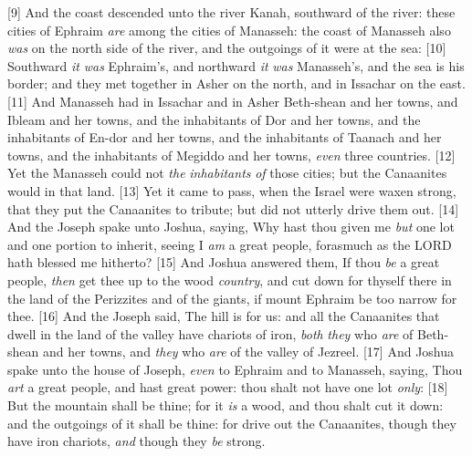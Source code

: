 [9] \textcolor[cmyk]{0.99998,1,0,0}{And the coast descended unto the river Kanah, southward of the river: these cities of Ephraim \emph{are} among the cities of Manasseh: the coast of Manasseh also \emph{was} on the north side of the river, and the outgoings of it were at the sea:}
[10] \textcolor[cmyk]{0.99998,1,0,0}{Southward \emph{it} \emph{was} Ephraim's, and northward \emph{it} \emph{was} Manasseh's, and the sea is his border; and they met together in Asher on the north, and in Issachar on the east.}
[11] \textcolor[cmyk]{0.99998,1,0,0}{And Manasseh had in Issachar and in Asher Beth-shean and her towns, and Ibleam and her towns, and the inhabitants of Dor and her towns, and the inhabitants of En-dor and her towns, and the inhabitants of Taanach and her towns, and the inhabitants of Megiddo and her towns, \emph{even} three countries.}
[12] \textcolor[cmyk]{0.99998,1,0,0}{Yet the  Manasseh could not  \emph{the} \emph{inhabitants} \emph{of} those cities; but the Canaanites would  in that land.}
[13] \textcolor[cmyk]{0.99998,1,0,0}{Yet it came to pass, when the  Israel were waxen strong, that they put the Canaanites to tribute; but did not utterly drive them out.}
[14] \textcolor[cmyk]{0.99998,1,0,0}{And the  Joseph spake unto Joshua, saying, Why hast thou given me \emph{but} one lot and one portion to inherit, seeing I \emph{am} a great people, forasmuch as the LORD hath blessed me hitherto?}
[15] \textcolor[cmyk]{0.99998,1,0,0}{And Joshua answered them, If thou \emph{be} a great people, \emph{then} get thee up to the wood \emph{country}, and cut down for thyself there in the land of the Perizzites and of the giants, if mount Ephraim be too narrow for thee.}
[16] \textcolor[cmyk]{0.99998,1,0,0}{And the  Joseph said, The hill is  for us: and all the Canaanites that dwell in the land of the valley have chariots of iron, \emph{both} \emph{they} who \emph{are} of Beth-shean and her towns, and \emph{they} who \emph{are} of the valley of Jezreel.}
[17] \textcolor[cmyk]{0.99998,1,0,0}{And Joshua spake unto the house of Joseph, \emph{even} to Ephraim and to Manasseh, saying, Thou \emph{art} a great people, and hast great power: thou shalt not have one lot \emph{only}:}
[18] \textcolor[cmyk]{0.99998,1,0,0}{But the mountain shall be thine; for it \emph{is} a wood, and thou shalt cut it down: and the outgoings of it shall be thine: for  drive out the Canaanites, though they have iron chariots, \emph{and} though they \emph{be} strong.}